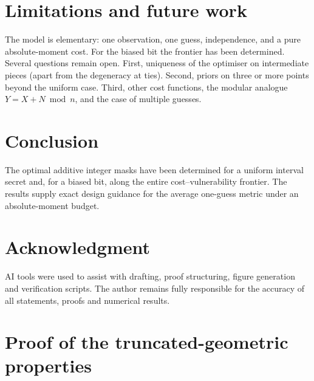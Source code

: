 \documentclass[conference]{IEEEtran}
\begin{document}
\section{Limitations and future work}
The model is elementary: one observation, one guess, independence, and a pure absolute-moment cost. For the biased bit the frontier has been determined. Several questions remain open. First, uniqueness of the optimiser on intermediate pieces (apart from the degeneracy at ties). Second, priors on three or more points beyond the uniform case. Third, other cost functions, the modular analogue \(Y=X+N\bmod n\), and the case of multiple guesses.

\section{Conclusion}
The optimal additive integer masks have been determined for a uniform interval secret and, for a biased bit, along the entire cost--vulnerability frontier. The results supply exact design guidance for the average one-guess metric under an absolute-moment budget.

\section*{Acknowledgment}
AI tools were used to assist with drafting, proof structuring, figure generation and verification scripts. The author remains fully responsible for the accuracy of all statements, proofs and numerical results.




\appendices
\section{Proof of the truncated-geometric properties}
\label{app:T}
\end{document}

